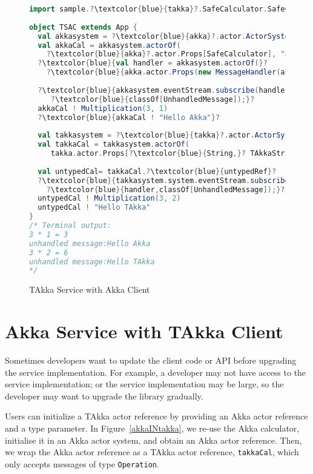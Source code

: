 \begin{figure}[h]
      \begin{lstlisting}[language=scala, escapechar=?]
import sample.?\textcolor{blue}{takka}?.SafeCalculator.SafeCalculator      
      
object TSAC extends App {
  val akkasystem = ?\textcolor{blue}{akka}?.actor.ActorSystem("AkkaSystem")
  val akkaCal = akkasystem.actorOf(
    ?\textcolor{blue}{akka}?.actor.Props[SafeCalculator], "acal")
  ?\textcolor{blue}{val handler = akkasystem.actorOf(}?
    ?\textcolor{blue}{akka.actor.Props(new MessageHandler(akkasystem)))}?
  
  ?\textcolor{blue}{akkasystem.eventStream.subscribe(handler,}?
     ?\textcolor{blue}{classOf[UnhandledMessage]);}?
  akkaCal ! Multiplication(3, 1)     
  ?\textcolor{blue}{akkaCal ! "Hello Akka"}?
  
  val takkasystem = ?\textcolor{blue}{takka}?.actor.ActorSystem("TAkkaSystem")
  val takkaCal = takkasystem.actorOf(
     takka.actor.Props[?\textcolor{blue}{String,}? TAkkaStringActor], "tcal")
  
  val untypedCal= takkaCal.?\textcolor{blue}{untypedRef}?  
  ?\textcolor{blue}{takkasystem.system.eventStream.subscribe(}?
    ?\textcolor{blue}{handler,classOf[UnhandledMessage]);}?  
  untypedCal ! Multiplication(3, 2)     
  untypedCal ! "Hello TAkka"
}
/* Terminal output:
3 * 1 = 3
unhandled message:Hello Akka
3 * 2 = 6
unhandled message:Hello TAkka
*/
    \end{lstlisting}
    \caption{TAkka Service with Akka Client}
\label{takkaINakka}    
\end{figure}


\section{Akka Service with TAkka Client}

Sometimes developers want to update the client code or API before 
upgrading the service implementation. For example, a developer may not have access to 
the service implementation; or the service implementation may be large, so the 
developer may want to upgrade the library gradually.

Users can initialize a TAkka actor reference by providing an Akka actor 
reference and a type parameter.  In Figure~\ref{akkaINtakka}, we re-use the 
Akka calculator, initialise it in an Akka actor system, and obtain an Akka 
actor reference.  Then, we wrap the Akka actor reference as a TAkka 
actor reference, {\tt takkaCal}, which only accepts messages of type
{\tt Operation}.


